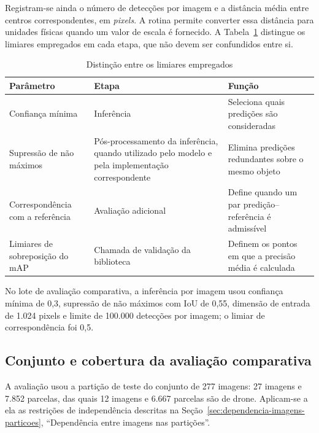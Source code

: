 Registram-se ainda o n\'umero de detec\c{c}\~oes por imagem e a dist\^ancia m\'edia entre centros correspondentes, em \textit{pixels}. A rotina permite converter essa dist\^ancia para unidades f\'isicas quando um valor de escala \'e fornecido. A Tabela~\ref{tab:limiares-empregados} distingue os limiares empregados em cada etapa, que n\~ao devem ser confundidos entre si.

\begin{table}[htb]
\centering
\caption{Distin\c{c}\~ao entre os limiares empregados}
\label{tab:limiares-empregados}
\small
\begin{tabular}{p{3.2cm}p{4.5cm}p{6cm}}
\hline
\textbf{Par\^ametro} & \textbf{Etapa} & \textbf{Fun\c{c}\~ao} \\
\hline
Confian\c{c}a m\'inima & Infer\^encia & Seleciona quais predi\c{c}\~oes s\~ao consideradas \\
Supress\~ao de n\~ao m\'aximos & P\'os-processamento da infer\^encia, quando utilizado pelo modelo e pela implementa\c{c}\~ao correspondente & Elimina predi\c{c}\~oes redundantes sobre o mesmo objeto \\
Correspond\^encia com a refer\^encia & Avalia\c{c}\~ao adicional & Define quando um par predi\c{c}\~ao--refer\^encia \'e admiss\'ivel \\
Limiares de sobreposi\c{c}\~ao do mAP & Chamada de valida\c{c}\~ao da biblioteca & Definem os pontos em que a precis\~ao m\'edia \'e calculada \\
\hline
\end{tabular}
\end{table}

No lote de avalia\c{c}\~ao comparativa, a infer\^encia por imagem usou confian\c{c}a m\'inima de 0,3, supress\~ao de n\~ao m\'aximos com IoU de 0,55, dimens\~ao de entrada de 1.024 pixels e limite de 100.000 detec\c{c}\~oes por imagem; o limiar de correspond\^encia foi 0,5.

\subsection{Conjunto e cobertura da avalia\c{c}\~ao comparativa}
\label{sec:conjunto-cobertura-avaliacao}

A avalia\c{c}\~ao usou a parti\c{c}\~ao de teste do conjunto de 277 imagens: 27 imagens e 7.852 parcelas, das quais 12 imagens e 6.667 parcelas s\~ao de drone. Aplicam-se a ela as restri\c{c}\~oes de independ\^encia descritas na Se\c{c}\~ao~\ref{sec:dependencia-imagens-particoes}, ``Depend\^encia entre imagens nas parti\c{c}\~oes''.


